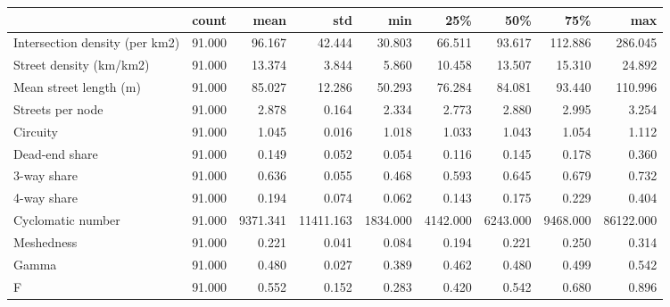 \begin{tabular}{lrrrrrrrr}
\toprule
 & count & mean & std & min & 25\% & 50\% & 75\% & max \\
\midrule
Intersection density (per km2) & 91.000 & 96.167 & 42.444 & 30.803 & 66.511 & 93.617 & 112.886 & 286.045 \\
Street density (km/km2) & 91.000 & 13.374 & 3.844 & 5.860 & 10.458 & 13.507 & 15.310 & 24.892 \\
Mean street length (m) & 91.000 & 85.027 & 12.286 & 50.293 & 76.284 & 84.081 & 93.440 & 110.996 \\
Streets per node & 91.000 & 2.878 & 0.164 & 2.334 & 2.773 & 2.880 & 2.995 & 3.254 \\
Circuity & 91.000 & 1.045 & 0.016 & 1.018 & 1.033 & 1.043 & 1.054 & 1.112 \\
Dead-end share & 91.000 & 0.149 & 0.052 & 0.054 & 0.116 & 0.145 & 0.178 & 0.360 \\
3-way share & 91.000 & 0.636 & 0.055 & 0.468 & 0.593 & 0.645 & 0.679 & 0.732 \\
4-way share & 91.000 & 0.194 & 0.074 & 0.062 & 0.143 & 0.175 & 0.229 & 0.404 \\
Cyclomatic number & 91.000 & 9371.341 & 11411.163 & 1834.000 & 4142.000 & 6243.000 & 9468.000 & 86122.000 \\
Meshedness & 91.000 & 0.221 & 0.041 & 0.084 & 0.194 & 0.221 & 0.250 & 0.314 \\
Gamma & 91.000 & 0.480 & 0.027 & 0.389 & 0.462 & 0.480 & 0.499 & 0.542 \\
F & 91.000 & 0.552 & 0.152 & 0.283 & 0.420 & 0.542 & 0.680 & 0.896 \\
\bottomrule
\end{tabular}
